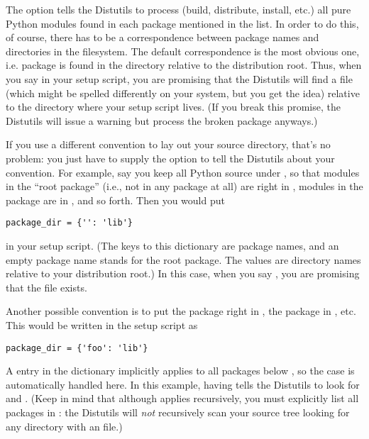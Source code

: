 \documentclass{howto}
\begin{document}
The  option tells the Distutils to process (build,
distribute, install, etc.) all pure Python modules found in each package
mentioned in the  list.  In order to do this, of
course, there has to be a correspondence between package names and
directories in the filesystem.  The default correspondence is the most
obvious one, i.e. package  is found in the directory
 relative to the distribution root.  Thus, when you say
 in your setup script, you are promising that
the Distutils will find a file  (which might
be spelled differently on your system, but you get the idea) relative to
the directory where your setup script lives.  (If you break this
promise, the Distutils will issue a warning but process the broken
package anyways.)

If you use a different convention to lay out your source directory,
that's no problem: you just have to supply the 
option to tell the Distutils about your convention.  For example, say
you keep all Python source under , so that modules in the
``root package'' (i.e., not in any package at all) are right in
, modules in the  package are in ,
and so forth.  Then you would put
\begin{verbatim}
package_dir = {'': 'lib'}
\end{verbatim}
in your setup script.  (The keys to this dictionary are package names,
and an empty package name stands for the root package.  The values are
directory names relative to your distribution root.)  In this case, when
you say , you are promising that the file
 exists.

Another possible convention is to put the  package right in 
, the  package in , etc.  This
would be written in the setup script as
\begin{verbatim}
package_dir = {'foo': 'lib'}
\end{verbatim}
A  entry in the 
dictionary implicitly applies to all packages below , so
the  case is automatically handled here.  In this
example, having  tells the Distutils
to look for  and
.  (Keep in mind that although
 applies recursively, you must explicitly list all
packages in : the Distutils will \emph{not} recursively
scan your source tree looking for any directory with an
 file.)
\end{document}
